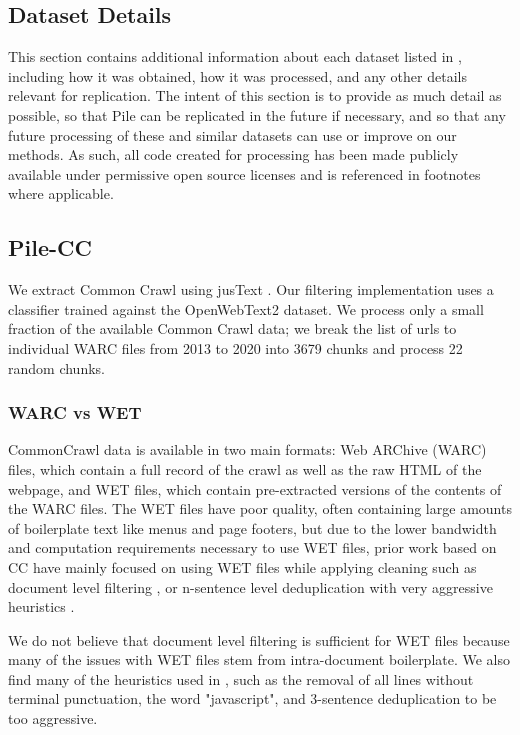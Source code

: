 \documentclass[11pt,a4paper]{article}
\begin{document}
\begin{appendices}
\section{Dataset Details}\label{apdx:data}

This section contains additional information about each dataset listed in , including how it was obtained, how it was processed, and any other details relevant for replication. The intent of this section is to provide as much detail as possible, so that Pile can be replicated in the future if necessary, and so that any future processing of these and similar datasets can use or improve on our methods. As such, all code created for processing has been made publicly available under permissive open source licenses and is referenced in footnotes where applicable.

\subsection{Pile-CC}
We extract Common Crawl using jusText \cite{justext}. Our filtering implementation uses a classifier trained against the OpenWebText2 dataset. We process only a small fraction of the available Common Crawl data; we break the list of urls to individual WARC files from 2013 to 2020 into 3679 chunks and process 22 random chunks.

\subsubsection{WARC vs WET}

CommonCrawl data is available in two main formats: Web ARChive (WARC) files, which contain a full record of the crawl as well as the raw HTML of the webpage, and WET files, which contain pre-extracted versions of the contents of the WARC files. The WET files have poor quality, often containing large amounts of boilerplate text like menus and page footers, but due to the lower bandwidth and computation requirements necessary to use WET files, prior work based on CC have mainly focused on using WET files while applying cleaning such as document level filtering \citep{GPT3,wenzek2019ccnet}, or n-sentence level deduplication with very aggressive heuristics \citep{T5}.

We do not believe that document level filtering is sufficient for WET files because many of the issues with WET files stem from intra-document boilerplate. We also find many of the heuristics used in \citet{T5}, such as the removal of all lines without terminal punctuation, the word "javascript", and 3-sentence deduplication to be too aggressive.


\end{appendices}
\end{document}
